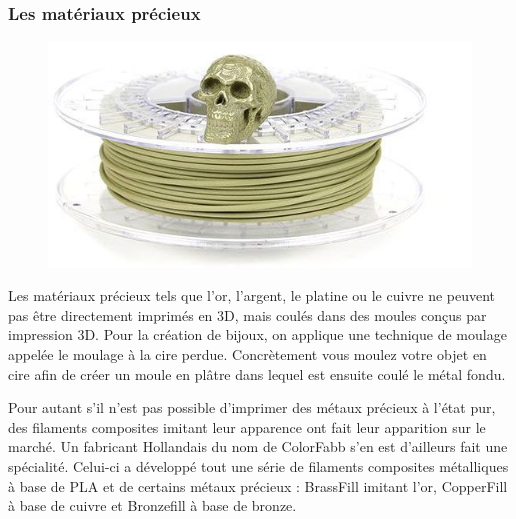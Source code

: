 \documentclass{article}
\begin{document}
\subsubsection{Les matériaux précieux}
\begin{figure}[h!]
\centering
\includegraphics[scale=0.3]{./images/brassfill.png}
\end{figure}\hfill
 \par\leavevmode\par
Les matériaux précieux tels que l'or, l'argent, le platine ou le cuivre ne peuvent pas être directement imprimés en 3D, mais coulés dans des moules conçus par impression 3D. Pour la création de bijoux, on applique une technique de moulage appelée le moulage à la cire perdue. Concrètement vous moulez votre objet en cire afin de créer un moule en plâtre dans lequel est ensuite coulé le métal fondu.\hfill
 \par\leavevmode\par
Pour autant s'il n'est pas possible d'imprimer des métaux précieux à l'état pur, des filaments composites imitant leur apparence ont fait leur apparition sur le marché. Un fabricant Hollandais du nom de ColorFabb s'en est d'ailleurs fait une spécialité. Celui-ci a développé tout une série de filaments composites métalliques à base de PLA et de certains métaux précieux : BrassFill imitant l'or, CopperFill à base de cuivre et Bronzefill à base de bronze.\hfill
 \par\leavevmode\par
{}
\newpage
\end{document}
